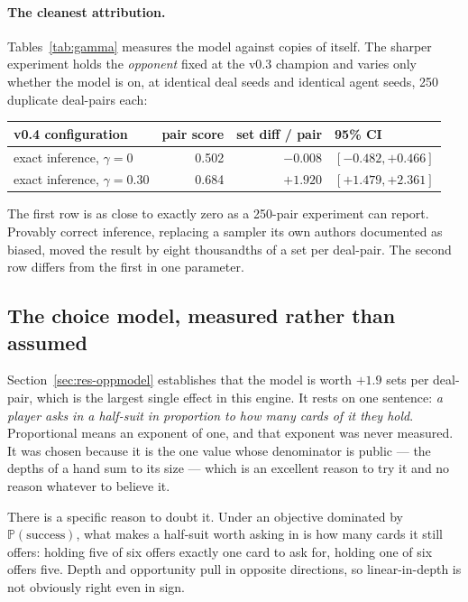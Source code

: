 \documentclass[11pt,a4paper]{article}
\newcommand{\Prob}{\ensuremath{\mathbb{P}}}
\begin{document}
\paragraph{The cleanest attribution.} Tables~\ref{tab:gamma} measures the model
against copies of itself. The sharper experiment holds the \emph{opponent} fixed
at the v0.3 champion and varies only whether the model is on, at identical deal
seeds and identical agent seeds, 250 duplicate deal-pairs each:

\begin{center}
\small
\begin{tabular}{lrrl}
\toprule
v0.4 configuration & pair score & set diff / pair & 95\% CI \\
\midrule
exact inference, $\gamma = 0$ & 0.502 & $-0.008$ & $[-0.482, +0.466]$ \\
exact inference, $\gamma = 0.30$ & 0.684 & $\mathbf{+1.920}$ & $[+1.479, +2.361]$ \\
\bottomrule
\end{tabular}
\end{center}

The first row is as close to exactly zero as a 250-pair experiment can report.
Provably correct inference, replacing a sampler its own authors documented as
biased, moved the result by eight thousandths of a set per deal-pair. The second
row differs from the first in one parameter.

\subsection{The choice model, measured rather than assumed}
\label{sec:res-choicecurve}

Section~\ref{sec:res-oppmodel} establishes that the model is worth $+1.9$ sets
per deal-pair, which is the largest single effect in this engine. It rests on
one sentence: \emph{a player asks in a half-suit in proportion to how many cards
of it they hold}. Proportional means an exponent of one, and that exponent was
never measured. It was chosen because it is the one value whose denominator is
public --- the depths of a hand sum to its size --- which is an excellent reason
to try it and no reason whatever to believe it.

There is a specific reason to doubt it. Under an objective dominated by
$\Prob(\text{success})$, what makes a half-suit worth asking in is how many cards
it still offers: holding five of six offers exactly one card to ask for, holding
one of six offers five. Depth and opportunity pull in opposite directions, so
linear-in-depth is not obviously right even in sign.
\end{document}
